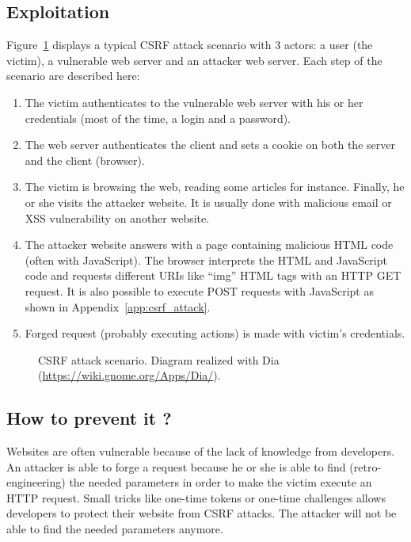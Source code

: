\documentclass[a4paper,11pt,openany]{report}
\begin{document}
  \subsection{Exploitation}
  Figure~\ref{figure:csrf_scenario} displays a typical CSRF attack scenario with 3 actors: a 
  user (the victim), a vulnerable web server and an attacker web server. Each step of the 
  scenario are described here:
  \begin{enumerate}
   \itemsep0pt %
   \item The victim authenticates to the vulnerable web server with his or her credentials (most 
   of the time, a login and a password).
   \item The web server authenticates the client and sets a cookie on both the server and the client (browser).
   \item The victim is browsing the web, reading some articles for instance. Finally, he or 
   she visits the attacker website. It is usually done with malicious email or XSS vulnerability 
   on another website.
   \item The attacker website answers with a page containing malicious HTML code (often with 
   JavaScript). The browser interprets the HTML and JavaScript code and requests different URIs like 
   ``img'' HTML tags with an HTTP GET request. It is also possible to execute POST requests with 
   JavaScript as shown in Appendix~\ref{app:csrf_attack}.
   \item Forged request (probably executing actions) is made with victim's credentials.
  \end{enumerate}
  
\begin{figure}[h!t]
  \vspace*{-30pt}
  \begin{center}
    \caption{
      CSRF attack scenario. Diagram realized with Dia (\url{https://wiki.gnome.org/Apps/Dia/}).
    }
    \label{figure:csrf_scenario}
  \end{center}
  \vspace*{-20pt}
\end{figure}
  
  \subsection{How to prevent it ?}
  Websites are often vulnerable because of the lack of knowledge from developers. An attacker is able 
  to forge a request because he or she is able to find (retro-engineering) the needed parameters in 
  order to make the victim execute an HTTP request. Small tricks like one-time tokens or one-time 
  challenges allows developers to protect their website from CSRF attacks. The attacker will not be able 
  to find the needed parameters anymore.
  
\end{document}

